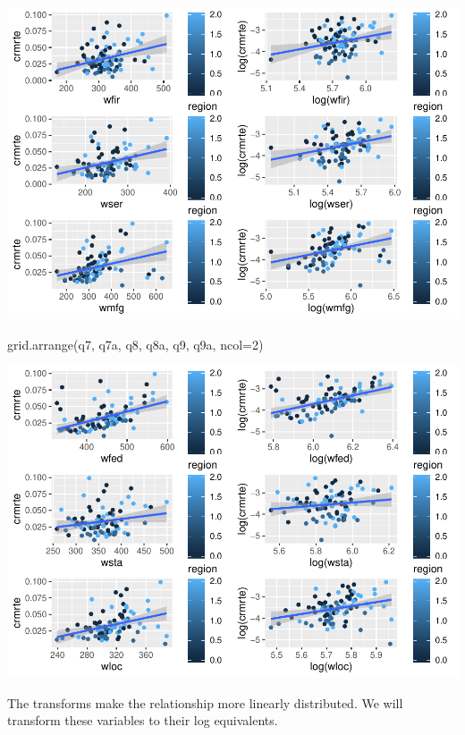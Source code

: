 \documentclass[]{article}
\newenvironment{Shaded}{}{}
\newcommand{\DataTypeTok}[1]{#1}
\newcommand{\DecValTok}[1]{#1}
\newcommand{\KeywordTok}[1]{\textcolor[rgb]{0.00,0.00,1.00}{#1}}
\newcommand{\NormalTok}[1]{#1}
\begin{document}
\includegraphics{Bagnard_Gaustad_Hartman_Leung_Lab_3_files/figure-latex/unnamed-chunk-47-2.pdf}

\begin{Shaded}
\begin{Highlighting}[]
\KeywordTok{grid.arrange}\NormalTok{(q7, q7a, q8, q8a, q9, q9a, }\DataTypeTok{ncol=}\DecValTok{2}\NormalTok{)}
\end{Highlighting}
\end{Shaded}

\includegraphics{Bagnard_Gaustad_Hartman_Leung_Lab_3_files/figure-latex/unnamed-chunk-47-3.pdf}

The transforms make the relationship more linearly distributed. We will
transform these variables to their log equivalents.
\end{document}
